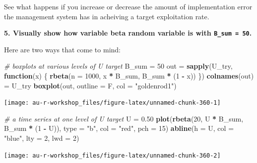 \documentclass[]{book}
\newenvironment{Shaded}{\begin{snugshade}}{\end{snugshade}}
\newcommand{\KeywordTok}[1]{\textcolor[rgb]{0.13,0.29,0.53}{\textbf{#1}}}
\newcommand{\DataTypeTok}[1]{\textcolor[rgb]{0.13,0.29,0.53}{#1}}
\newcommand{\DecValTok}[1]{\textcolor[rgb]{0.00,0.00,0.81}{#1}}
\newcommand{\FloatTok}[1]{\textcolor[rgb]{0.00,0.00,0.81}{#1}}
\newcommand{\StringTok}[1]{\textcolor[rgb]{0.31,0.60,0.02}{#1}}
\newcommand{\CommentTok}[1]{\textcolor[rgb]{0.56,0.35,0.01}{\textit{#1}}}
\newcommand{\ControlFlowTok}[1]{\textcolor[rgb]{0.13,0.29,0.53}{\textbf{#1}}}
\newcommand{\OperatorTok}[1]{\textcolor[rgb]{0.81,0.36,0.00}{\textbf{#1}}}
\newcommand{\NormalTok}[1]{#1}
\theoremstyle{definition}
\theoremstyle{definition}
\theoremstyle{definition}
\theoremstyle{remark}
\begin{document}
See what happens if you increase or decrease the amount of
implementation error the management system has in acheiving a target
exploitation rate.

\textbf{5. Visually show how variable beta random variable is with
\texttt{B\_sum\ =\ 50}.}

Here are two ways that come to mind:

\begin{Shaded}
\begin{Highlighting}[]
\CommentTok{# boxplots at various levels of U target}
\NormalTok{B_sum =}\StringTok{ }\DecValTok{50}
\NormalTok{out =}\StringTok{ }\KeywordTok{sapply}\NormalTok{(U_try, }\ControlFlowTok{function}\NormalTok{(x) \{}
  \KeywordTok{rbeta}\NormalTok{(}\DataTypeTok{n =} \DecValTok{1000}\NormalTok{, x }\OperatorTok{*}\StringTok{ }\NormalTok{B_sum, B_sum }\OperatorTok{*}\StringTok{ }\NormalTok{(}\DecValTok{1} \OperatorTok{-}\StringTok{ }\NormalTok{x))}
\NormalTok{\})}
\KeywordTok{colnames}\NormalTok{(out) =}\StringTok{ }\NormalTok{U_try}
\KeywordTok{boxplot}\NormalTok{(out, }\DataTypeTok{outline =}\NormalTok{ F, }\DataTypeTok{col =} \StringTok{"goldenrod1"}\NormalTok{)}
\end{Highlighting}
\end{Shaded}

\begin{center}\texttt{[image: au-r-workshop\_files/figure-latex/unnamed-chunk-360-1]} \end{center}

\begin{Shaded}
\begin{Highlighting}[]
\CommentTok{# a time series at one level of U target}
\NormalTok{U =}\StringTok{ }\FloatTok{0.50}
\KeywordTok{plot}\NormalTok{(}\KeywordTok{rbeta}\NormalTok{(}\DecValTok{20}\NormalTok{, U }\OperatorTok{*}\StringTok{ }\NormalTok{B_sum, B_sum }\OperatorTok{*}\StringTok{ }\NormalTok{(}\DecValTok{1} \OperatorTok{-}\StringTok{ }\NormalTok{U)), }\DataTypeTok{type =} \StringTok{"b"}\NormalTok{, }\DataTypeTok{col =} \StringTok{"red"}\NormalTok{, }\DataTypeTok{pch =} \DecValTok{15}\NormalTok{)}
\KeywordTok{abline}\NormalTok{(}\DataTypeTok{h =}\NormalTok{ U, }\DataTypeTok{col =} \StringTok{"blue"}\NormalTok{, }\DataTypeTok{lty =} \DecValTok{2}\NormalTok{, }\DataTypeTok{lwd =} \DecValTok{2}\NormalTok{)}
\end{Highlighting}
\end{Shaded}

\begin{center}\texttt{[image: au-r-workshop\_files/figure-latex/unnamed-chunk-360-2]} \end{center}
\end{document}
